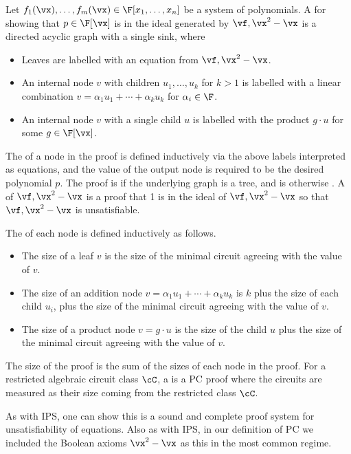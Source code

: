\documentclass{toc}
\begin{document}
\begin{definition}\label{defn:pc}
        Let $f_1(\vx),\ldots,f_m(\vx)\in\F[x_1,\ldots,x_n]$ be a system of polynomials. A  for showing that $p\in\F[\vx]$ is in the ideal generated by $\vf,\vx^2-\vx$ is a directed acyclic graph with a single sink, where
        \begin{itemize}
                \item Leaves are labelled with an equation from $\vf,\vx^2-\vx$.
                \item An internal node $v$ with children $u_1,\ldots,u_k$ for $k>1$ is labelled with a linear combination $v=\alpha_1 u_1+\cdots +\alpha_ku_k$ for $\alpha_i\in \F$.
                \item An internal node $v$ with a single child $u$ is labelled with the product $g\cdot u$ for some $g\in\F[\vx]$.
        \end{itemize}
        The  of a node in the proof is defined inductively via the above labels interpreted as equations, and the value of the output node is required to be the desired polynomial $p$.  The proof is  if the underlying graph is a tree, and is otherwise .  A  of $\vf,\vx^2-\vx$ is a proof that 1 is in the ideal of $\vf,\vx^2-\vx$ so that $\vf,\vx^2-\vx$ is unsatisfiable.

        The  of each node is defined inductively as follows.
        \begin{itemize}
                \item The size of a leaf $v$ is the size of the minimal circuit agreeing with the value of $v$.
                \item The size of an addition node $v=\alpha_1 u_1+\cdots +\alpha_ku_k$ is $k$ plus the size of each child $u_i$, plus the size of the minimal circuit agreeing with the value of $v$.
                \item The size of a product node $v=g\cdot u$ is the size of the child $u$ plus the size of the minimal circuit agreeing with the value of $v$.
        \end{itemize}
        The size of the proof is the sum of the sizes of each node in the proof. For a restricted algebraic circuit class $\cC$, a  is a PC proof where the circuits are measured as their size coming from the restricted class $\cC$.
\end{definition}

As with IPS, one can show this is a sound and complete proof system for unsatisfiability of equations.  Also as with IPS, in our definition of PC we included the Boolean axioms $\vx^2-\vx$ as this in the most common regime.
\end{document}
